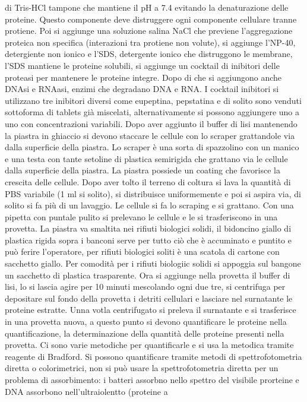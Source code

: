 di Tris-HCl tampone che mantiene il pH a 7.4 evitando la denaturazione delle proteine. Questo componente deve distruggere ogni componente cellulare tranne protiene. Poi si aggiunge
una soluzione salina NaCl che previene l'aggregazione proteica non specifica (interazioni tra protiene non volute), si aggiunge l'NP-40, detergiente non ionico e l'SDS, detergente ionico
che distruggono le membrane, l'SDS mantiene le proteine solubili, si aggiunge un cocktail di inibitori delle proteasi per mantenere le proteine integre. Dopo di che si aggiungono anche
DNAsi e RNAasi, enzimi che degradano DNA e RNA. I cocktail inibitori si utilizzano tre inibitori diversi come eupeptina, pepstatina e di solito sono venduti sottoforma di tablets gi\`a 
miscelati, alternativamente si possono aggiungere uno a uno con concentrazioni variabili. Dopo aver aggiunto il buffer di lisi mantenendo la piastra in ghiaccio si devono staccare le
cellule con lo scraper grattandole via dalla superficie della piastra. Lo scraper \`e una sorta di spazzolino con un manico e una testa con tante setoline di plastica semirigida che
grattano via le cellule dalla superficie della piastra. La piastra possiede un coating che favorisce la crescita delle cellule. Dopo aver tolto il terreno di coltura si lava la quantit\`a
di PBS variabile (1 ml si solito), si distribuisce uniformemente e poi si aspira via, di solito si fa pi\`u di un lavaggio. Le cellule si fa lo scraping e si grattano. Con una pipetta 
con puntale pulito si prelevano le cellule e le si trasferiscono in una provetta. La piastra va smaltita nei rifiuti biologici solidi, il bidoncino giallo di plastica rigida sopra i 
banconi serve per tutto ci\`o che \`e accuminato e puntito e pu\`o ferire l'operatore, per rifiuti biologici soliti \`e una scatola di cartone con sacchetto giallo. Per comodit\`a per
i rifiuti biologiic solidi si appoggia sul bangone un sacchetto di plastica trasparente. Ora si aggiunge nella provetta il buffer di lisi, lo si lascia agire per 10 minuti mescolando
ogni due tre, si centrifuga per depositare sul fondo della provetta i detriti cellulari e lasciare nel surnatante le proteine estratte. Unna votla centrifugato si preleva il surnatante e 
si trasferisce in una provetta nuova, a questo punto si devono quantificare le proteine nella quantificazione, la determinazione della quantit\`a delle proteine presenti nella provetta. 
Ci sono varie metodiche per quantificarle e si usa la metodica tramite reagente di Bradford. Si possono quantificare tramite metodi di spettrofotometria diretta o colorimetrici, non
si pu\`o usare la spettrofotometria diretta per un problema di assorbimento: i batteri assorbno nello spettro del visibile prorteine e DNA assorbono nell'ultraiolentto (proteine a 
